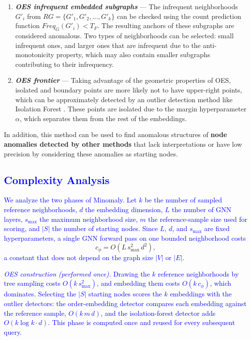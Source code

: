 \documentclass[preprint,12pt]{elsarticle}
\newcommand{\new}[1]{\textcolor{blue}{#1}}
\theoremstyle{plain}
\theoremstyle{definition}
\theoremstyle{remark}
\begin{document}
\begin{enumerate}[label=(\alph*)]
    \item \textbf{\textit{OES infrequent embedded subgraphs}} --- The infrequent neighborhoods $G'_i$ from $RG=\{G'_1, G'_2, \dots, G'_k\}$ can be checked using the count prediction function $Freq_G(G'_i) < T_F$. The resulting anchors of these subgraphs are considered anomalous. Two types of neighborhoods can be selected: small infrequent ones, and larger ones that are infrequent due to the anti-monotonicity property, which may also contain smaller subgraphs contributing to their infrequency.
    \item \textbf{\textit{OES frontier}} --- Taking advantage of the geometric properties of OES, isolated and boundary points are more likely not to have upper-right points, which can be approximately detected by an outlier detection method like Isolation Forest \cite{liu2008isolation}. These points are isolated due to the margin hyperparameter $\alpha$, which separates them from the rest of the embeddings.
\end{enumerate}

In addition, this method can be used to find anomalous structures of \textbf{node anomalies detected by other methods} that lack interpretations or have low precision by considering these anomalies as starting nodes.

\subsection{\new{Complexity Analysis}}\label{sec:complexity}

\new{We analyze the two phases of Minomaly. Let $k$ be the number of sampled reference neighborhoods, $d$ the embedding dimension, $L$ the number of GNN layers, $s_{\max}$ the maximum neighborhood size, $m$ the reference-sample size used for scoring, and $|S|$ the number of starting nodes. Since $L$, $d$, and $s_{\max}$ are fixed hyperparameters, a single GNN forward pass on one bounded neighborhood costs}
{\color{blue}\[
c_{\phi} = O\!\left(L\, s_{\max}^{2}\, d^{2}\right),
\]}
\new{a constant that does not depend on the graph size $|V|$ or $|E|$.}

\new{\emph{OES construction (performed once).} Drawing the $k$ reference neighborhoods by tree sampling costs $O(k\, s_{\max}^{2})$, and embedding them costs $O(k\, c_{\phi})$, which dominates. Selecting the $|S|$ starting nodes scores the $k$ embeddings with the outlier detectors: the order-embedding detector compares each embedding against the reference sample, $O(k\, m\, d)$, and the isolation-forest detector adds $O(k \log k \cdot d)$. This phase is computed once and reused for every subsequent query.}
\end{document}

